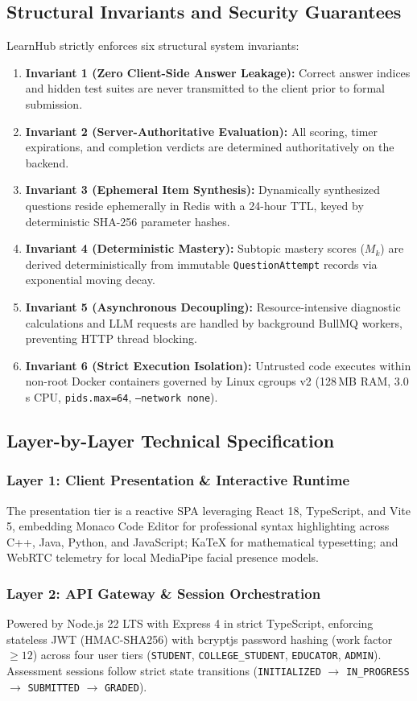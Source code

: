 \documentclass[journal]{IEEEtran}
\begin{document}
\subsection{Structural Invariants and Security Guarantees}
LearnHub strictly enforces six structural system invariants:
\begin{enumerate}
\item \textbf{Invariant 1 (Zero Client-Side Answer Leakage):} Correct answer indices and hidden test suites are never transmitted to the client prior to formal submission.
\item \textbf{Invariant 2 (Server-Authoritative Evaluation):} All scoring, timer expirations, and completion verdicts are determined authoritatively on the backend.
\item \textbf{Invariant 3 (Ephemeral Item Synthesis):} Dynamically synthesized questions reside ephemerally in Redis with a 24-hour TTL, keyed by deterministic SHA-256 parameter hashes.
\item \textbf{Invariant 4 (Deterministic Mastery):} Subtopic mastery scores ($M_k$) are derived deterministically from immutable \texttt{QuestionAttempt} records via exponential moving decay.
\item \textbf{Invariant 5 (Asynchronous Decoupling):} Resource-intensive diagnostic calculations and LLM requests are handled by background BullMQ workers, preventing HTTP thread blocking.
\item \textbf{Invariant 6 (Strict Execution Isolation):} Untrusted code executes within non-root Docker containers governed by Linux cgroups v2 (128\,MB RAM, 3.0\,s CPU, \texttt{pids.max=64}, \texttt{--network none}).
\end{enumerate}

\subsection{Layer-by-Layer Technical Specification}
\subsubsection{Layer 1: Client Presentation \& Interactive Runtime}
The presentation tier is a reactive SPA leveraging React 18, TypeScript, and Vite 5, embedding Monaco Code Editor for professional syntax highlighting across C++, Java, Python, and JavaScript; KaTeX for mathematical typesetting; and WebRTC telemetry for local MediaPipe facial presence models.

\subsubsection{Layer 2: API Gateway \& Session Orchestration}
Powered by Node.js 22 LTS with Express 4 in strict TypeScript, enforcing stateless JWT (HMAC-SHA256) with bcryptjs password hashing (work factor $\ge 12$) across four user tiers (\texttt{STUDENT}, \texttt{COLLEGE\_STUDENT}, \texttt{EDUCATOR}, \texttt{ADMIN}). Assessment sessions follow strict state transitions (\texttt{INITIALIZED} $\rightarrow$ \texttt{IN\_PROGRESS} $\rightarrow$ \texttt{SUBMITTED} $\rightarrow$ \texttt{GRADED}).
\end{document}

